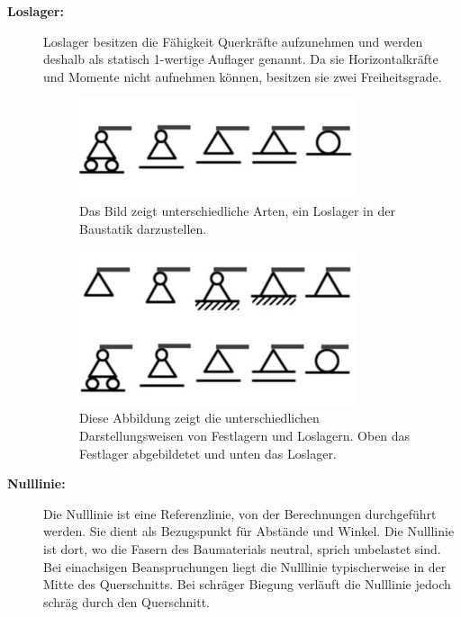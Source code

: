 \begin{description}
\item[\textbf{Loslager:}] Loslager besitzen die Fähigkeit Querkräfte aufzunehmen und werden deshalb als statisch 1-wertige Auflager genannt.
%
Da sie Horizontalkräfte und Momente nicht aufnehmen können, besitzen sie zwei Freiheitsgrade.
\begin{figure}
	\centering
	\includegraphics[width=0.8\textwidth]{papers/balken/images/teil1/Loslager.jpg}
	\caption{Das Bild zeigt unterschiedliche Arten, ein Loslager in der Baustatik darzustellen.}
	\label{fig:Das Bild zeigt unterschiedliche Arten, ein Loslager in der Baustatik darzustellen.}
\end{figure}
\begin{figure}
\centering
\includegraphics[width=0.8\textwidth]{papers/balken/images/teil1/Gegenueberstellung.png}
\caption{Diese Abbildung zeigt die unterschiedlichen Darstellungsweisen von Festlagern und Loslagern. Oben das Festlager abgebildetet und unten das Loslager.}
\label{fig:Diese Abbildung zeigt die unterschiedlichen Darstellungsweisen von Festlagern und Loslagern. Oben das Festlager abgebildetet und unten das Loslager.}
\end{figure}

\item[\textbf{Nulllinie:}] Die Nulllinie ist eine Referenzlinie, von der Berechnungen durchgeführt werden. Sie dient als Bezugspunkt für Abstände und Winkel.
%
Die Nulllinie ist dort, wo die Fasern des Baumaterials neutral, sprich unbelastet sind.
Bei einachsigen Beanspruchungen liegt die Nulllinie typischerweise in der Mitte des Querschnitts.
Bei schräger Biegung verläuft die Nulllinie jedoch schräg durch den Querschnitt.


\end{description}
